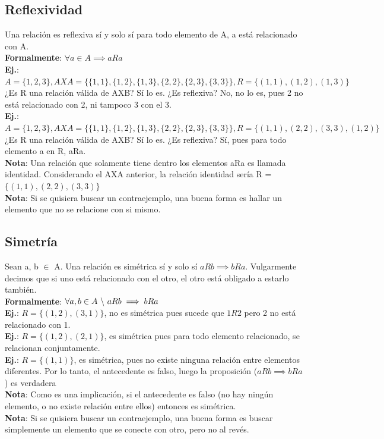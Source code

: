 \documentclass[10pt,a4paper]{article}
\begin{document}
\subsection*{Reflexividad}
Una relación es reflexiva sí y solo sí para todo elemento de A, a está relacionado con A. \\
\textbf{Formalmente}: $ \forall a \in A \implies aRa$ \\
\textbf{Ej.}: $A = \{1, 2, 3\}, AXA=\{\{1, 1\}, \{1, 2\}, \{1, 3\}, \{2, 2\}, \{2, 3\}, \{3, 3\}\}, R = \{(1, 1), (1, 2), (1, 3)\}$ ¿Es R una relación válida de AXB? Sí lo es. ¿Es reflexiva? No, no lo es, pues 2 no está relacionado con 2, ni tampoco 3 con el 3.\\
\textbf{Ej.}: $A = \{1, 2, 3\}, AXA=\{\{1, 1\}, \{1, 2\}, \{1, 3\}, \{2, 2\}, \{2, 3\}, \{3, 3\}\}, R = \{(1, 1), (2, 2), (3, 3), (1, 2)\}$ ¿Es R una relación válida de AXB? Sí lo es. ¿Es reflexiva? Sí, pues para todo elemento a en R, aRa.\\

\textbf{Nota}: Una relación que solamente tiene dentro los elementos aRa es llamada identidad. Considerando el AXA anterior, la relación identidad sería R = $\{(1, 1), (2, 2), (3, 3)\}$  \\
\textbf{Nota}: Si se quisiera buscar un contraejemplo, una buena forma es hallar un elemento que no se relacione con si mismo. 
\subsection*{Simetría}
Sean a, b $\in$ A. Una relación es simétrica sí y solo sí $aRb \implies bRa$. Vulgarmente decimos que si uno está relacionado con el otro, el otro está obligado a estarlo también. \\
\textbf{Formalmente}: $ \forall a, b \in A \ \symbol{92} \ aRb \implies bRa$ \\
\textbf{Ej.}: $R = \{(1, 2), (3, 1)\}$, no es simétrica pues sucede que $1R2$ pero 2 no está relacionado con 1. \\
\textbf{Ej.}: $R = \{(1, 2), (2, 1)\}$, es simétrica pues para todo elemento relacionado, se relacionan conjuntamente. \\
\textbf{Ej.}: $R = \{(1, 1)\}$, es simétrica, pues no existe ninguna relación entre elementos diferentes. Por lo tanto, el antecedente es falso, luego la proposición ($aRb \implies bRa$) es verdadera \\

\textbf{Nota}: Como es una implicación, si el antecedente es falso (no hay ningún elemento, o no existe relación entre ellos) entonces es simétrica.  \\
\textbf{Nota}: Si se quisiera buscar un contraejemplo, una buena forma es buscar simplemente un elemento que se conecte con otro, pero no al revés.
\end{document}
